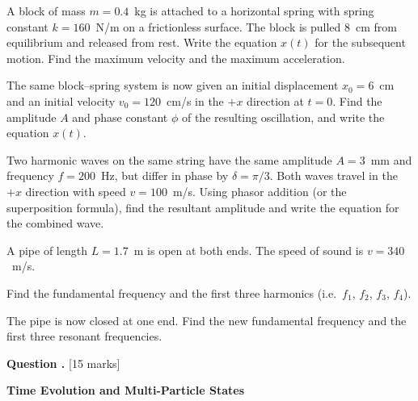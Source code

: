 \documentclass[12pt,a4paper]{article}
\newcounter{questioncounter}
\newcommand{\question}[1]{%
  \stepcounter{questioncounter}%
  \vspace{0.5cm}%
  \noindent\textbf{Question \thequestioncounter.} \hfill [#1 marks]%
  \vspace{0.2cm}%
  \par%
}
\begin{document}
\begin{parts}
\item A block of mass $m = 0.4$~kg is attached to a horizontal spring with spring constant $k = 160$~N/m on a frictionless surface. The block is pulled 8~cm from equilibrium and released from rest. Write the equation $x(t)$ for the subsequent motion. Find the maximum velocity and the maximum acceleration. 

\item The same block--spring system is now given an initial displacement $x_0 = 6$~cm and an initial velocity $v_0 = 120$~cm/s in the $+x$ direction at $t = 0$. Find the amplitude $A$ and phase constant $\phi$ of the resulting oscillation, and write the equation $x(t)$. 

\item Two harmonic waves on the same string have the same amplitude $A = 3$~mm and frequency $f = 200$~Hz, but differ in phase by $\delta = \pi/3$. Both waves travel in the $+x$ direction with speed $v = 100$~m/s. Using phasor addition (or the superposition formula), find the resultant amplitude and write the equation for the combined wave. 

\item A pipe of length $L = 1.7$~m is open at both ends. The speed of sound is $v = 340$~m/s.
\begin{parts}
\item Find the fundamental frequency and the first three harmonics (i.e.\ $f_1$, $f_2$, $f_3$, $f_4$). 
\item The pipe is now closed at one end. Find the new fundamental frequency and the first three resonant frequencies. 
\end{parts}
\end{parts}

\newpage

\question{15}

\noindent\textbf{Time Evolution and Multi-Particle States}
\end{document}

